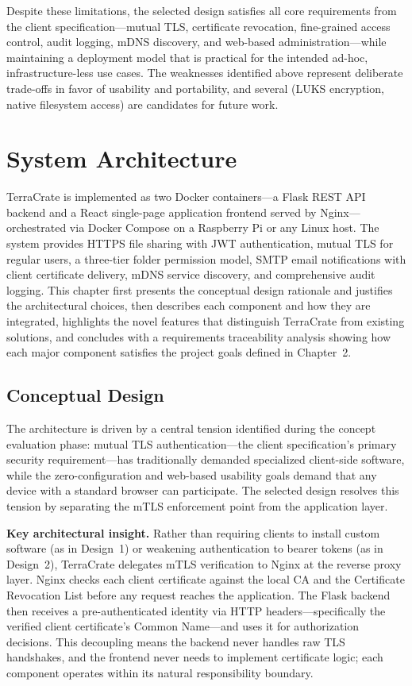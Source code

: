 \documentclass[12pt,letterpaper]{report}
\begin{document}
Despite these limitations, the selected design satisfies all core requirements from the client specification---mutual TLS, certificate revocation, fine-grained access control, audit logging, mDNS discovery, and web-based administration---while maintaining a deployment model that is practical for the intended ad-hoc, infrastructure-less use cases. The weaknesses identified above represent deliberate trade-offs in favor of usability and portability, and several (LUKS encryption, native filesystem access) are candidates for future work.

\chapter{System Architecture}

TerraCrate is implemented as two Docker containers---a Flask REST API backend and a React single-page application frontend served by Nginx---orchestrated via Docker Compose on a Raspberry Pi or any Linux host. The system provides HTTPS file sharing with JWT authentication, mutual TLS for regular users, a three-tier folder permission model, SMTP email notifications with client certificate delivery, mDNS service discovery, and comprehensive audit logging. This chapter first presents the conceptual design rationale and justifies the architectural choices, then describes each component and how they are integrated, highlights the novel features that distinguish TerraCrate from existing solutions, and concludes with a requirements traceability analysis showing how each major component satisfies the project goals defined in Chapter~2.

\section{Conceptual Design}

The architecture is driven by a central tension identified during the concept evaluation phase: mutual TLS authentication---the client specification's primary security requirement---has traditionally demanded specialized client-side software, while the zero-configuration and web-based usability goals demand that any device with a standard browser can participate. The selected design resolves this tension by separating the mTLS enforcement point from the application layer.

\textbf{Key architectural insight.} Rather than requiring clients to install custom software (as in Design~1) or weakening authentication to bearer tokens (as in Design~2), TerraCrate delegates mTLS verification to Nginx at the reverse proxy layer. Nginx checks each client certificate against the local CA and the Certificate Revocation List before any request reaches the application. The Flask backend then receives a pre-authenticated identity via HTTP headers---specifically the verified client certificate's Common Name---and uses it for authorization decisions. This decoupling means the backend never handles raw TLS handshakes, and the frontend never needs to implement certificate logic; each component operates within its natural responsibility boundary.
\end{document}
